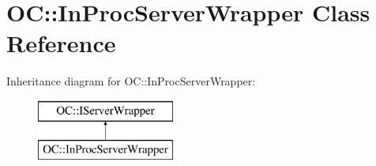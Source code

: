 \hypertarget{classOC_1_1InProcServerWrapper}{}\section{O\+C\+:\+:In\+Proc\+Server\+Wrapper Class Reference}
\label{classOC_1_1InProcServerWrapper}
Inheritance diagram for O\+C\+:\+:In\+Proc\+Server\+Wrapper\+:\begin{figure}[H]
\begin{center}
\leavevmode
\includegraphics[height=2.000000cm]{classOC_1_1InProcServerWrapper}
\end{center}
\end{figure}
